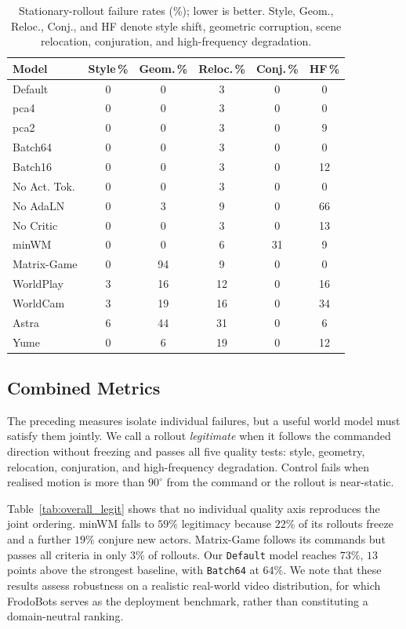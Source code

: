 \documentclass[letterpaper]{article} %
\begin{document}
\begin{table}[t]
\centering
{%
\small
\setlength{\tabcolsep}{1mm}
\begin{tabular}{@{}lccccc@{}}
\toprule
Model & Style\,\% & Geom.\,\% & Reloc.\,\% & Conj.\,\% & HF\,\% \\
\midrule
Default       & 0 & 0  & 3  & 0  & 0  \\
pca4          & 0 & 0  & 3  & 0  & 0  \\
pca2          & 0 & 0  & 3  & 0  & 9  \\
Batch64       & 0 & 0  & 3  & 0  & 0  \\
Batch16       & 0 & 0  & 3  & 0  & 12 \\
No Act. Tok.  & 0 & 0  & 3  & 0  & 0  \\
No AdaLN      & 0 & 3  & 9  & 0  & 66 \\
No Critic     & 0 & 0  & 3  & 0  & 13 \\
\midrule
minWM         & 0 & 0  & 6  & 31 & 9  \\
Matrix-Game   & 0 & 94 & 9  & 0  & 0  \\
WorldPlay     & 3 & 16 & 12 & 0  & 16 \\
WorldCam      & 3 & 19 & 16 & 0  & 34 \\
Astra         & 6 & 44 & 31 & 0  & 6  \\
Yume          & 0 & 6  & 19 & 0  & 12 \\
\bottomrule
\end{tabular}
}
\caption{
    Stationary-rollout failure rates (\%); lower is better.
    Style, Geom., Reloc., Conj., and HF denote style shift, geometric
    corruption, scene relocation, conjuration, and high-frequency degradation.
}
\label{tab:stationary_quality}
\end{table}

\subsection{Combined Metrics}
\label{sec:combined}

The preceding measures isolate individual failures, but a useful world model
must satisfy them jointly. We call a rollout \emph{legitimate} when it follows
the commanded direction without freezing and passes all five quality tests:
style, geometry, relocation, conjuration, and high-frequency degradation.
Control fails when realised motion is more than $90^\circ$ from the command or
the rollout is near-static.

Table~\ref{tab:overall_legit} shows that no individual quality axis reproduces
the joint ordering. minWM falls to $59\%$ legitimacy because $22\%$ of its
rollouts freeze and a further $19\%$ conjure new actors. Matrix-Game follows
its commands but passes all criteria in only $3\%$ of rollouts. Our
\texttt{Default} model reaches $73\%$, $13$ points above the strongest
baseline, with \texttt{Batch64} at $64\%$. We note that these results assess robustness on a
realistic real-world video distribution, for which FrodoBots serves as the
deployment benchmark, rather than constituting a domain-neutral ranking.
\end{document}
